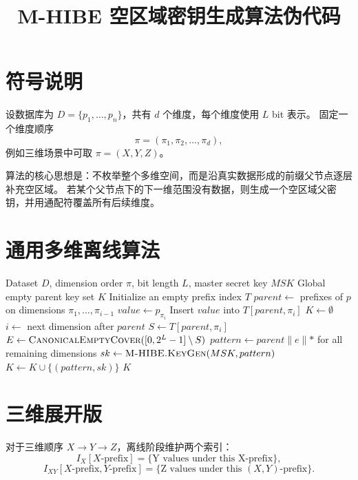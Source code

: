\documentclass[11pt,a4paper]{ctexart}
\title{M-HIBE 空区域密钥生成算法伪代码}
\author{}
\date{}
\begin{document}
\maketitle

\section{符号说明}

设数据库为 $D=\{p_1,\ldots,p_n\}$，共有 $d$ 个维度，每个维度使用 $L$ bit 表示。
固定一个维度顺序
\[
  \pi=(\pi_1,\pi_2,\ldots,\pi_d),
\]
例如三维场景中可取 $\pi=(X,Y,Z)$。

算法的核心思想是：不枚举整个多维空间，而是沿真实数据形成的前缀父节点逐层补充空区域。
若某个父节点下的下一维范围没有数据，则生成一个空区域父密钥，并用通配符覆盖所有后续维度。

\section{通用多维离线算法}

\begin{algorithm}[H]
\caption{Offline Empty Parent Key Generation}
\begin{algorithmic}[1]
\Require Dataset $D$, dimension order $\pi$, bit length $L$, master secret key $MSK$
\Ensure Global empty parent key set $K$
\State Initialize an empty prefix index $T$
    \State $parent \gets$ prefixes of $p$ on dimensions $\pi_1,\ldots,\pi_{i-1}$
    \State $value \gets p_{\pi_i}$
    \State Insert $value$ into $T[parent,\pi_i]$
  \EndFor
\EndFor
\State $K \gets \emptyset$
  \State $i \gets$ next dimension after $parent$
  \State $S \gets T[parent,\pi_i]$
  \State $E \gets \textsc{CanonicalEmptyCover}([0,2^L-1] \setminus S)$
    \State $pattern \gets parent \parallel e \parallel *$ for all remaining dimensions
    \State $sk \gets \textsc{M-HIBE.KeyGen}(MSK, pattern)$
    \State $K \gets K \cup \{(pattern, sk)\}$
  \EndFor
\EndFor
\State \Return $K$
\end{algorithmic}
\end{algorithm}

\section{三维展开版}

对于三维顺序 $X \rightarrow Y \rightarrow Z$，离线阶段维护两个索引：
\[
  I_X[X\text{-prefix}] = \{\text{Y values under this X-prefix}\},
\]
\[
  I_{XY}[X\text{-prefix},Y\text{-prefix}] = \{\text{Z values under this }(X,Y)\text{-prefix}\}.
\]
\end{document}
